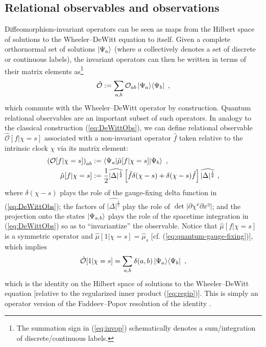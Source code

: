 \documentclass[12pt]{iopart}
\def\eq#1{\begin{equation}\begin{aligned}#1\end{aligned}\end{equation}}
\def\eref#1{(\ref{eq:#1})}
\def\Ob{\mathcal{O}}
\begin{document}
\subsection{Relational observables and observations}
Diffeomorphism-invariant operators can be seen as maps from the Hilbert space of solutions to the Wheeler--DeWitt equation to itself. Given a complete orthornormal set of solutions $\ket{\Psi_{a}}$ (where $a$ collectively denotes a set of discrete or continuous labels), the invariant operators can then be written in terms of their matrix elements as\footnote{The summation sign in \eref{invop} schematically denotes a sum/integration of discrete/continuous labels.}
\eq{\label{eq:invop}
\hat{\Ob} := \sum_{a,b}\Ob_{ab}\ket{\Psi_a}\!\bra{\Psi_b} \ ,
}
which commute with the Wheeler--DeWitt operator by construction. Quantum relational observables are an important subset of such operators. In analogy to the classical construction \eref{DeWittObs}, we can define relational observable $\hat{\Ob}[f|\chi=s]$ associated with a non-invariant operator $\hat{f}$ taken relative to the intrinsic clock $\chi$ via its matrix element:
\eq{\label{eq:qrelobs}
\left(\Ob[f|\chi=s]\right)_{ab} &:= \braket{\Psi_a|\hat{\mu}[f|\chi=s]|\Psi_b} \ , \\
\hat{\mu}[f|\chi=s] &:= \frac12\widehat{|\Delta|^{\frac12}}\left[\hat{f}\delta(\chi-s)+\delta(\chi-s)\hat{f}\right]\widehat{|\Delta|^{\frac12}} \ ,
}
where $\delta(\chi-s)$ plays the role of the gauge-fixing delta function in \eref{DeWittObs}; the factors of $\widehat{|\Delta|^{\frac12}}$ play the role of $\det|\partial{\chi^{\nu}}\partial{x^{\eta}}|$; and the projection onto the states $\ket{\Psi_{a,b}}$ plays the role of the spacetime integration in \eref{DeWittObs} so as to ``invariantize'' the observable. Notice that $\hat{\mu}[f|\chi=s]$ is a symmetric operator and $\hat{\mu}[1|\chi=s] = \hat{\mu}_s$ [cf. \eref{quantum-gauge-fixing}], which implies
\eq{
\hat{\Ob}[1|\chi=s] = \sum_{a,b}\delta(a,b)\ket{\Psi_a}\!\bra{\Psi_b} \ ,
}
which is the identity on the Hilbert space of solutions to the Wheeler--DeWitt equation [relative to the regularized inner product \eref{regip}]. This is simply an operator version of the Faddeev--Popov resolution of the identity \citep{Chataignier:2019kof,Chataignier:2020fys,Chataig:Thesis}.
\end{document}
